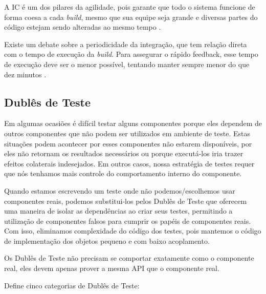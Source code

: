 A IC é um dos pilares da agilidade, pois garante que todo o sistema funcione de forma coesa a cada \textit{build}, mesmo que sua equipe seja grande e diversas partes do código estejam sendo alteradas ao mesmo tempo \cite{CaelumCI}.

Existe um debate sobre a periodicidade da integração, que tem relação direta com o tempo de execução da \textit{build}. Para assegurar o rápido feedback, esse tempo de execução deve ser o menor possível, tentando manter sempre menor do que dez minutos \cite{FowlerCI}.


\subsection{Dublês de Teste}

Em algumas ocasiões é difícil testar alguns componentes porque eles dependem de outros componentes que não podem ser utilizados em ambiente de teste. Estas situações podem acontecer por esses componentes não estarem disponíveis, por eles não retornam os resultados necessários ou porque executá-los iria trazer efeitos colaterais indesejados. Em outros casos, nossa estratégia de testes requer que nós tenhamos mais controle do comportamento interno do componente.

Quando estamos escrevendo um teste onde não podemos/escolhemos usar componentes reais, podemos substitui-los pelos Dublês de Teste que oferecem uma maneira de isolar as dependências ao criar seus testes, permitindo a utilização de componentes falsos para cumprir os papéis de componentes reais. Com isso, eliminamos complexidade do código dos testes, pois mantemos o código de implementação dos objetos pequeno e com baixo acoplamento.

Os Dublês de Teste não precisam se comportar exatamente como o componente real, eles devem apenas prover a mesma API que o componente real.

 Define cinco categorias de Dublês de Teste:


